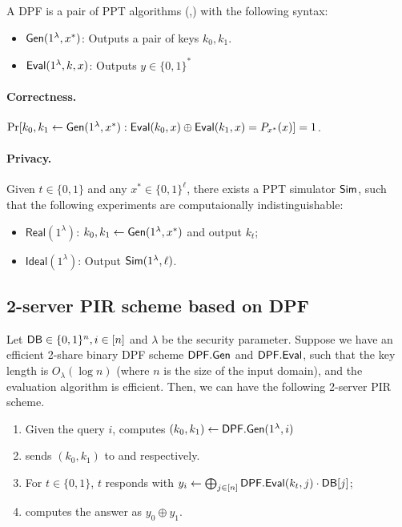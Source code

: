 \begin{definition}
    A DPF is a pair of PPT algorithms (\Gen,\Eval) with the following syntax:
    \hfill
    \begin{itemize}
        \item ${\sf Gen}(1^\lambda,x^*)$: Outputs a pair of keys $k_0,k_1$.
        \item ${\sf Eval}(1^\lambda, k,x)$: Outputs $y \in \{0,1\}^*$
    \end{itemize}
    \paragraph{Correctness.} $\Pr[k_0,k_1 \leftarrow {\sf Gen}(1^\lambda, x^*):{\sf Eval}(k_0,x) \oplus {\sf Eval}(k_1,x) = P_{x^*}(x)] = 1$.
    \paragraph{Privacy.} Given $t\in\{0,1\}$ and any $x^*\in \{0,1\}^\ell$, there exists a PPT simulator ${\sf Sim}$, such that the following experiments are computaionally indistinguishable:
    \begin{itemize}
        \item $\mathsf{Real}(1^\lambda)$: $k_0,k_1\leftarrow  {\sf Gen}(1^\lambda, x^*)$ and output $k_t$;
        \item $\mathsf{Ideal}(1^\lambda)$: Output ${\sf Sim}(1^\lambda, \ell)$.
    \end{itemize}
\end{definition}


\subsection{2-server PIR scheme based on DPF}

Let ${\sf DB} \in \{0,1\}^{n}, i \in [n]$ and $\lambda$ be the security parameter.
Suppose we have an efficient 2-share binary DPF scheme ${\sf DPF.Gen}$ and ${\sf DPF.Eval}$, such that the key length is $O_\lambda(\log n)$ (where $n$ is the size of the input domain), and the evaluation algorithm is efficient. 
Then, we can have the following 2-server PIR scheme. %

\begin{enumerate}
    \item Given the query $i$, \Client computes $(k_0,k_1) \leftarrow {\sf DPF}.{\sf Gen}(1^\lambda, i)$
    \item \Client sends $(k_0,k_1)$ to  and  respectively.
    \item For $t\in\{0,1\}$, \Server $t$ responds with $y_i \leftarrow \bigoplus_{j\in [n]} {\sf DPF}.{\sf Eval}(k_t,j)\cdot {\sf DB}[j]$;
    \item \Client computes the answer as $y_0 \oplus y_1$.
\end{enumerate}

